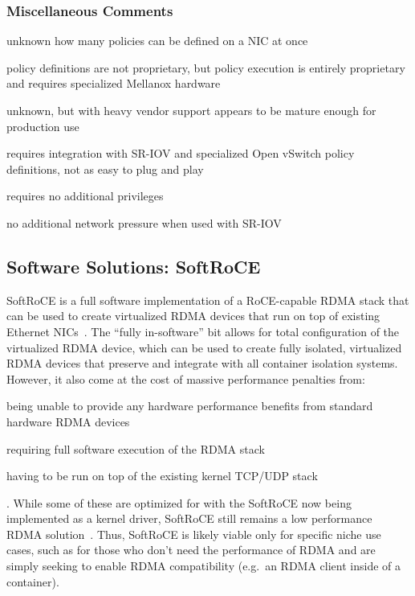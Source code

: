 \documentclass[12pt,titlepage]{article}
\begin{document}
\subsubsection*{Miscellaneous Comments}
\begin{description}[nolistsep,font={{\scshape\bfseries}}]
	\item[Scalability Limits] unknown how many policies can be defined on a NIC at once
	\item[Proprietary] policy definitions are not proprietary, but policy execution is entirely proprietary and requires specialized Mellanox hardware
	\item[Maturity] unknown, but with heavy vendor support appears to be mature enough for production use
	\item[Ease in Deployment] requires integration with SR-IOV and specialized Open vSwitch policy definitions, not as easy to plug and play
	\item[Execution Privileges] requires no additional privileges
	\item[Network Pressure] no additional network pressure when used with SR-IOV
\end{description}


\subsection{Software Solutions: SoftRoCE}
SoftRoCE is a full software implementation of a RoCE-capable RDMA stack that can be used to create virtualized RDMA devices that run on top of existing Ethernet NICs~\cite{softroceoverview}. 
The ``fully in-software'' bit allows for total configuration of the virtualized RDMA device, which can be used to create fully isolated, virtualized RDMA devices that preserve and integrate with all container isolation systems.
However, it also come at the cost of massive performance penalties from: 
\begin{enumerate*}[label={(\arabic*)},itemjoin*={{, and }},itemjoin={{, }}]
	\item being unable to provide any hardware performance benefits from standard hardware RDMA devices
	\item requiring full software execution of the RDMA stack
	\item having to be run on top of the existing kernel TCP/UDP stack
\end{enumerate*}.
While some of these are optimized for with the SoftRoCE now being implemented as a kernel driver, SoftRoCE still remains a low performance RDMA solution~\cite{softrocedriver}.
Thus, SoftRoCE is likely viable only for specific niche use cases, such as for those who don't need the performance of RDMA and are simply seeking to enable RDMA compatibility (e.g.\ an RDMA client inside of a container).
\end{document}
